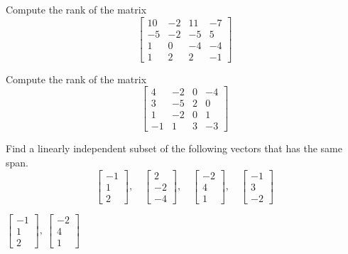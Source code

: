 \begin{exercise}
Compute the rank of the matrix
\begin{equation*}
\begin{bmatrix}
10 & -2 & 11 & -7 \\ 
-5 & -2 & -5 & 5 \\
1 & 0 & -4 & -4 \\
1 & 2 & 2 & -1
\end{bmatrix} 
\end{equation*}
\end{exercise}
%

\begin{exercise}
Compute the rank of the matrix
\begin{equation*}
\begin{bmatrix}
4 & -2 & 0 & -4 \\
3 & -5 & 2 & 0 \\
1 & -2 & 0 & 1 \\
-1 & 1 & 3 & -3
\end{bmatrix} 
\end{equation*}
\end{exercise}
%

\begin{exercise}
Find a linearly independent subset of the following vectors that has
the same span.
\begin{equation*}
\begin{bmatrix}
-1 \\ 1 \\ 2
\end{bmatrix}
, \quad
\begin{bmatrix}
2 \\ -2 \\ -4
\end{bmatrix}
, \quad
\begin{bmatrix}
-2 \\ 4 \\ 1
\end{bmatrix}
, \quad
\begin{bmatrix}
-1 \\ 3 \\ -2
\end{bmatrix}
\end{equation*}
\end{exercise}
\comboSol{%
}
{%
$\left[\begin{smallmatrix} -1\\ 1\\ 2 \end{smallmatrix}\right],\ \left[\begin{smallmatrix} -2 \\4  \\1 \end{smallmatrix}\right]$
}

